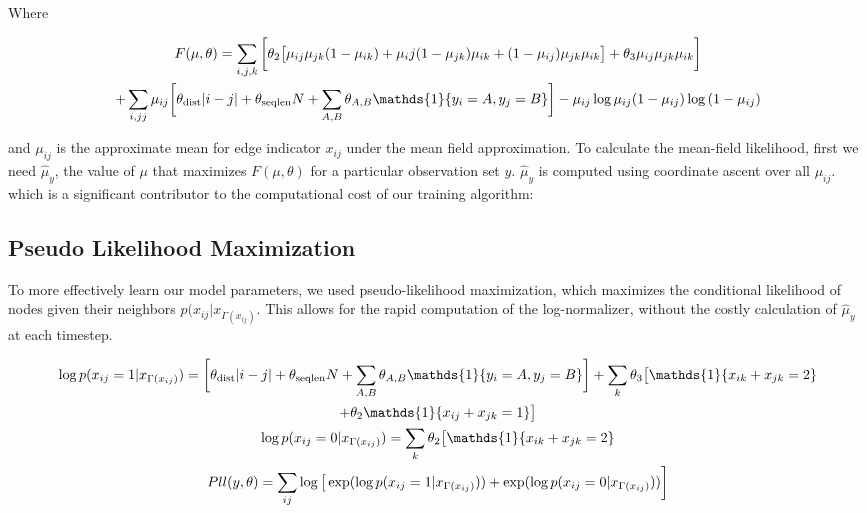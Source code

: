 \documentclass{article}
\begin{document}
Where 

\begin{multline} \label{eq:f}
F(\mu, \theta) = \sum_{i, j, k} \bigg[\theta_2 \big[\mu_{ij}\mu_{jk}(1-\mu_{ik}) + \mu_ij(1-\mu_{jk})\mu_{ik} + (1 - \mu_{ij})\mu_{jk}\mu_{ik} \big] + \theta_3 \mu_{ij}\mu_{jk}\mu_{ik} \bigg] \\
+ \sum_{i, jj}\mu_{ij}\bigg[\theta_{\textmd{dist}}|i - j|+ \theta_{\textmd{seqlen}}N + \sum_{A, B} \theta_{A, B}\mathds{1}\{y_i = A, y_j = B\}\bigg] - \mu_{ij} \log{\mu_{ij}} (1 - \mu_{ij})\log{(1 - \mu_{ij})}
\end{multline}

and $\mu_{ij}$ is the approximate mean for edge indicator $x_{ij}$ under the mean field approximation. To calculate the mean-field likelihood, first we need $\hat{\mu}_{y}$, the value of $\mu$ that maximizes $F(\mu, \theta)$ for a particular observation set $y$. $\hat{\mu}_{y}$ is computed using coordinate ascent over all $\mu_{ij}$. which is a significant contributor to the computational cost of our training algorithm:







\subsection{Pseudo Likelihood Maximization}

To more effectively learn our model parameters, we used pseudo-likelihood maximization, which maximizes the conditional likelihood of nodes given their neighbors $p(x_{ij} | x_{\Gamma(x_{ij})}$. This allows for the rapid computation of the log-normalizer, without the costly calculation of $\hat{\mu}_{y}$ at each timestep. 

\begin{multline}\label{eq:pll}
\log p(x_{ij} = 1 | x_{\Gamma(x_{ij})}) = \bigg[\theta_{\textmd{dist}}|i - j|+ \theta_{\textmd{seqlen}}N + \sum_{A, B} \theta_{A, B}\mathds{1}\{y_i = A, y_j = B\}\bigg] + \sum_k \theta_3 \big[\mathds{1}\{ x_{ik} + x_{jk} = 2\}  \\
+ \theta_2 \mathds{1}\{x_{ij} + x_{jk} = 1\} \big] \\
\log p(x_{ij} = 0 | x_{\Gamma(x_{ij})}) =  \sum_k \theta_2 \big[\mathds{1}\{ x_{ik} + x_{jk} = 2\} \\
Pll(y, \theta) = \sum_{ij} \log \big[\exp( \log p(x_{ij} = 1 | x_{\Gamma(x_{ij})})) + \exp( \log p(x_{ij} = 0 | x_{\Gamma(x_{ij})})) \bigg]
\end{multline}
\end{document}
